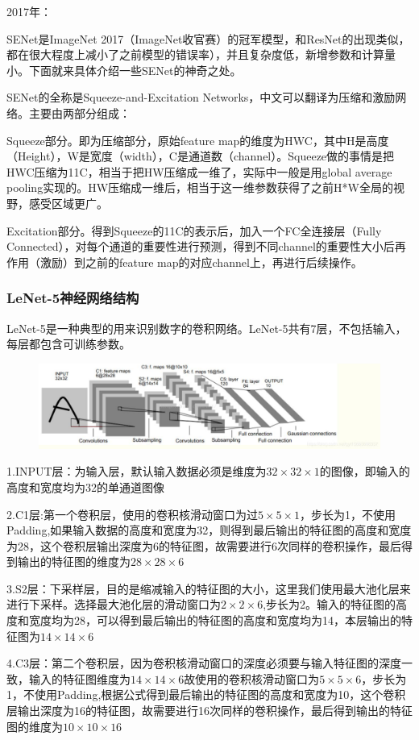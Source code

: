 \documentclass[openbib]{article}
\begin{document}
2017年：

SENet是ImageNet 2017（ImageNet收官赛）的冠军模型，和ResNet的出现类似，都在很大程度上减小了之前模型的错误率），并且复杂度低，新增参数和计算量小。下面就来具体介绍一些SENet的神奇之处。

SENet的全称是Squeeze-and-Excitation Networks，中文可以翻译为压缩和激励网络。主要由两部分组成：

Squeeze部分。即为压缩部分，原始feature map的维度为HWC，其中H是高度（Height），W是宽度（width），C是通道数（channel）。Squeeze做的事情是把HWC压缩为11C，相当于把HW压缩成一维了，实际中一般是用global average pooling实现的。HW压缩成一维后，相当于这一维参数获得了之前H*W全局的视野，感受区域更广。

Excitation部分。得到Squeeze的11C的表示后，加入一个FC全连接层（Fully Connected），对每个通道的重要性进行预测，得到不同channel的重要性大小后再作用（激励）到之前的feature map的对应channel上，再进行后续操作。
\subsubsection{LeNet-5神经网络结构}
LeNet-5是一种典型的用来识别数字的卷积网络。LeNet-5共有7层，不包括输入，每层都包含可训练参数。
\begin{figure}[htbp]
	\centering
	\includegraphics[scale=0.3]{LeNet-5神经网络结构.jpg}
\end{figure}

1.INPUT层：为输入层，默认输入数据必须是维度为$32\times32\times1$的图像，即输入的高度和宽度均为32的单通道图像

2.C1层:第一个卷积层，使用的卷积核滑动窗口为过$5\times5\times1$，步长为1，不使用Padding,如果输入数据的高度和宽度为32，则得到最后输出的特征图的高度和宽度为28，这个卷积层输出深度为6的特征图，故需要进行6次同样的卷积操作，最后得到输出的特征图的维度为$28\times28\times6$

3.S2层：下采样层，目的是缩减输入的特征图的大小，这里我们使用最大池化层来进行下采样。选择最大池化层的滑动窗口为$2\times2\times6$,步长为2。输入的特征图的高度和宽度均为28，可以得到最后输出的特征图的高度和宽度均为14，本层输出的特征图为$14\times14\times6$

4.C3层：第二个卷积层，因为卷积核滑动窗口的深度必须要与输入特征图的深度一致，输入的特征图维度为$14\times14\times6$故使用的卷积核滑动窗口为$5\times5\times6$，步长为1，不使用Padding,根据公式得到最后输出的特征图的高度和宽度为10，这个卷积层输出深度为16的特征图，故需要进行16次同样的卷积操作，最后得到输出的特征图的维度为$10\times10\times16$
\end{document}
